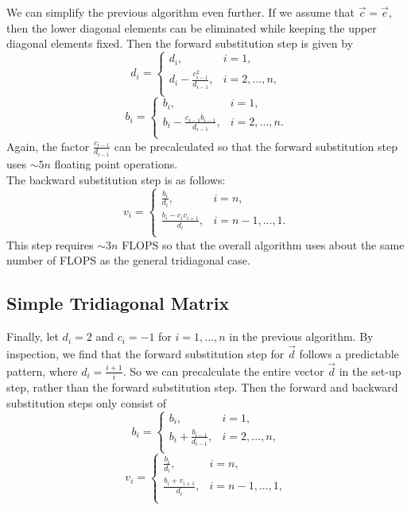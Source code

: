 \documentclass[prb,aps,twocolumn,showpacs,10pt]{revtex4-1}
\begin{document}
We can simplify the previous algorithm even further. If we assume that $\vec{c}=\vec{e}$, then the lower diagonal elements can be eliminated while keeping the upper diagonal elements fixed. Then the forward substitution step is given by
\begin{equation}
d_i = \begin{cases} 
      d_i, &i=1,\\
      d_i-\frac{c_{i-1}^2}{d_{i-1}}, &i=2,...,n,\\
   \end{cases}
\end{equation}
\begin{equation}
b_i = \begin{cases} 
      b_i, &i=1,\\
      b_i-\frac{c_{i-1}b_{i-1}}{d_{i-1}}, &i=2,...,n.\\
   \end{cases}
\end{equation}
Again, the factor $\frac{c_{i-1}}{d_{i-1}}$ can be precalculated so that the forward substitution step uses $\sim 5n$ floating point operations. \\

The backward substitution step is as follows:
\begin{equation}
v_i = \begin{cases} 
      \frac{b_i}{d_i}, &i=n,\\
      \frac{b_i-c_iv_{i+1}}{d_i}, &i=n-1,...,1.\\
   \end{cases}
\end{equation}
This step requires $\sim 3n$ FLOPS so that the overall algorithm uses about the same number of FLOPS as the general tridiagonal case. 

\subsection{Simple Tridiagonal Matrix}

Finally, let $d_i=2$ and $c_i=-1$ for $i = 1, ...,n$ in the previous algorithm. By inspection, we find that the forward substitution step for $\vec{d}$ follows a predictable pattern, where $d_i = \frac{i+1}{i}$. So we can precalculate the entire vector $\vec{d}$ in the set-up step, rather than the forward substitution step. Then the forward and backward substitution steps only consist of
\begin{equation}
b_i = \begin{cases} 
      b_i, &i=1,\\
      b_i+\frac{b_{i-1}}{d_{i-1}}, &i=2,...,n,\\
   \end{cases}
\end{equation}
\begin{equation}
v_i = \begin{cases} 
      \frac{b_i}{d_i}, &i=n,\\
      \frac{b_i+v_{i+1}}{d_i}, &i=n-1,...,1,\\
   \end{cases}
\end{equation}
\end{document}

